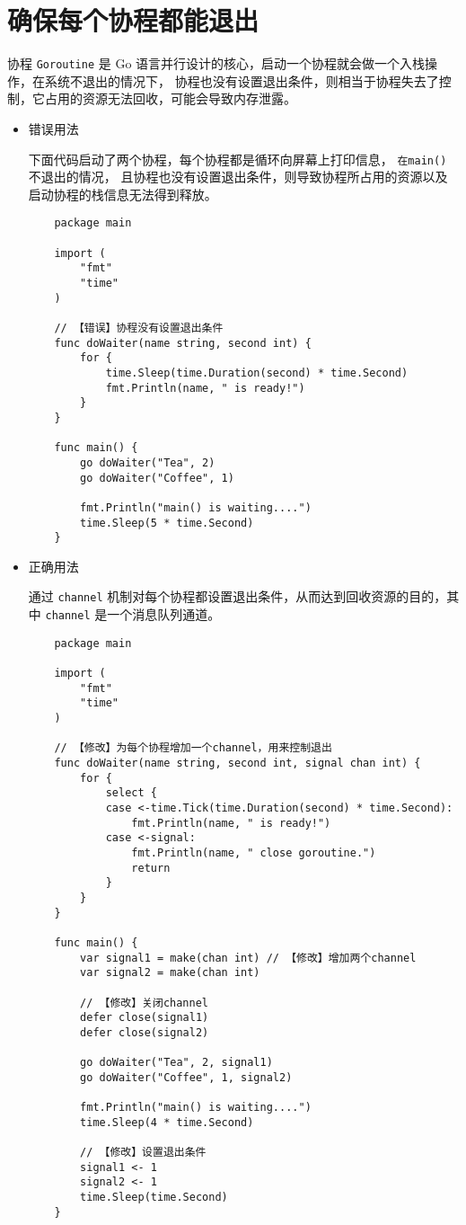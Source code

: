 \section{确保每个协程都能退出}
协程 \texttt{Goroutine} 是 Go 语言并行设计的核心，启动一个协程就会做一个入栈操作，在系统不退出的情况下，
协程也没有设置退出条件，则相当于协程失去了控制，它占用的资源无法回收，可能会导致内存泄露。

\begin{itemize}[leftmargin=4em]
\item 错误用法

  下面代码启动了两个协程，每个协程都是循环向屏幕上打印信息， \texttt{在main()} 不退出的情况，
  且协程也没有设置退出条件，则导致协程所占用的资源以及启动协程的栈信息无法得到释放。
  \begin{verbatim}
    package main

    import (
    	"fmt"
    	"time"
    )

    // 【错误】协程没有设置退出条件
    func doWaiter(name string, second int) {
    	for {
    		time.Sleep(time.Duration(second) * time.Second)
    		fmt.Println(name, " is ready!")
    	}
    }

    func main() {
    	go doWaiter("Tea", 2)
    	go doWaiter("Coffee", 1)

    	fmt.Println("main() is waiting....")
    	time.Sleep(5 * time.Second)
    }
  \end{verbatim}
\item 正确用法

  通过 \texttt{channel} 机制对每个协程都设置退出条件，从而达到回收资源的目的，其中 \texttt{channel} 是一个消息队列通道。
  \begin{verbatim}
    package main

    import (
    	"fmt"
    	"time"
    )

    // 【修改】为每个协程增加一个channel，用来控制退出
    func doWaiter(name string, second int, signal chan int) {
    	for {
    		select {
    		case <-time.Tick(time.Duration(second) * time.Second):
    			fmt.Println(name, " is ready!")
    		case <-signal:
    			fmt.Println(name, " close goroutine.")
    			return
    		}
    	}
    }

    func main() {
    	var signal1 = make(chan int) // 【修改】增加两个channel
    	var signal2 = make(chan int)

    	// 【修改】关闭channel
    	defer close(signal1)
    	defer close(signal2)

    	go doWaiter("Tea", 2, signal1)
    	go doWaiter("Coffee", 1, signal2)

    	fmt.Println("main() is waiting....")
    	time.Sleep(4 * time.Second)

    	// 【修改】设置退出条件
    	signal1 <- 1
    	signal2 <- 1
    	time.Sleep(time.Second)
    }
  \end{verbatim}
\end{itemize}

